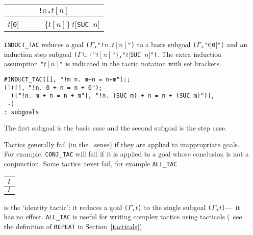 \begin{center}
\begin{tabular}{c} \\
{\small\verb|!|}$n${\small\verb|.|}$t[n]$ \\ \hline \hline
$t[${\small\verb|0|}$]$ {\small\verb|     |} $\{t[n]\}\ t[${\small\verb|SUC |}$n]$
\end{tabular}
\end{center}

{\small\verb|INDUCT_TAC|} reduces a goal
{\small\verb|(|}$\Gamma${\small\verb|,"!|}$n${\small\verb|.|}$t[n]${\small\verb|")|} to a basis subgoal
{\small\verb|(|}$\Gamma${\small\verb|,"|}$t[${\small\verb|0|}$]${\small\verb|")|}
and an induction step subgoal
{\small\verb|(|}$\Gamma\cup\{${\small\verb|"|}$t[n]${\small\verb|"|}$\}${\small\verb|,"|}$t[${\small\verb|SUC |}$n]${\small\verb|")|}.
The extra induction assumption {\small\verb|"|}$t[n]${\small\verb|"|}
is indicated in the tactic notation with set brackets.

\begin{session}\begin{verbatim}
#INDUCT_TAC([], "!m n. m+n = n+m");;
([([], "!n. 0 + n = n + 0");
  (["!n. m + n = n + m"], "!n. (SUC m) + n = n + (SUC m)")],
 -)
: subgoals
\end{verbatim}\end{session}

\noindent The first subgoal is the basis case and the second subgoal is
the step case.

Tactics generally fail (in the \ML\ sense) if they are applied to
inappropriate
goals. For example, {\small\verb|CONJ_TAC|} will fail if it is applied to a goal whose
conclusion is not a conjunction. Some tactics never fail, for example
{\small\verb|ALL_TAC|}


\begin{center}
\begin{tabular}{c} \\
$t$ \\ \hline \hline
$t$
\end{tabular}
\end{center}

\noindent is the `identity tactic'; it reduces a goal
{\small\verb|(|}$\Gamma${\small\verb|,|}$t${\small\verb|)|}
to the single
subgoal {\small\verb|(|}$\Gamma${\small\verb|,|}$t${\small\verb|)|}---\ie\
it has no effect. {\small\verb|ALL_TAC|} is useful for writing
complex tactics using tacticals (\eg\ see the definition of
{\small\verb|REPEAT|} in Section~\ref{tacticals}).



